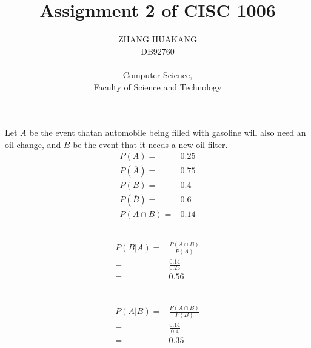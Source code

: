\documentclass{article}
\title{Assignment 2 of CISC 1006}
\author{ZHANG HUAKANG \\ DB92760 \\ \\ Computer Science, \\Faculty of Science and Technology}
\begin{document}
    \maketitle
    \section{}
    Let $A$ be the event thatan automobile being filled with gasoline will also need an oil change, and $B$ be the event that  it needs a new oil filter.
    \begin{equation*}
        \begin{split}
            P(A)=&0.25\\
            P(\overline{A})=&0.75\\
            P(B)=&0.4\\
            P(\overline{B})=&0.6\\
            P(A\cap B)=&0.14
        \end{split}
    \end{equation*}
        \subsection{}
            \paragraph{
                \begin{equation*}
                    \begin{split}
                        P(B|A)=&\frac{P(A\cap B)}{P(A)}\\
                            =&\frac{0.14}{0.25}\\
                            =&0.56\\
                    \end{split}
                \end{equation*}
            }
        \subsection{}
            \paragraph{
                \begin{equation*}
                    \begin{split}
                        P(A|B)=&\frac{P(A\cap B)}{P(B)}\\
                            =&\frac{0.14}{0.4}\\
                            =&0.35\\
                    \end{split}
                \end{equation*}
            }
\end{document}
